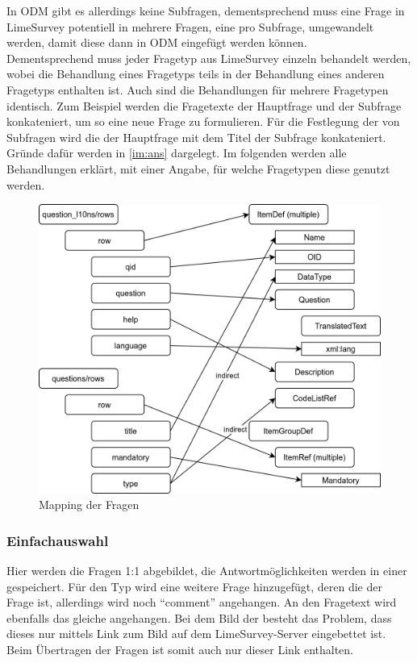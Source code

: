 In ODM gibt es allerdings keine Subfragen, dementsprechend muss eine Frage in LimeSurvey potentiell in mehrere Fragen, eine pro Subfrage, umgewandelt werden, damit diese dann in ODM eingefügt werden können.\\

Dementsprechend muss jeder Fragetyp aus LimeSurvey einzeln behandelt werden, wobei die Behandlung eines Fragetyps teils in der Behandlung eines anderen Fragetyps enthalten ist.
Auch sind die Behandlungen für mehrere Fragetypen identisch.
Zum Beispiel werden die Fragetexte der Hauptfrage und der Subfrage konkateniert, um so eine neue Frage  zu formulieren.
Für die Festlegung der  von Subfragen wird die  der Hauptfrage mit dem Titel der Subfrage konkateniert.
Gründe dafür werden in \cref{im:ans} dargelegt.
Im folgenden werden alle Behandlungen erklärt, mit einer Angabe, für welche Fragetypen diese genutzt werden.

\begin{figure}[h]
			\centering
			\includegraphics[width=.80\textwidth]{./img/m_questions.png}
			\caption{Mapping der Fragen}
\end{figure}

\subsubsection{Einfachauswahl}
\label{e:sc}

Hier werden die Fragen 1:1 abgebildet, die Antwortmöglichkeiten werden in einer  gespeichert.
Für den Typ  wird eine weitere Frage hinzugefügt, deren  die  der Frage ist, allerdings wird noch \enquote{comment} angehangen.
An den Fragetext wird ebenfalls das gleiche angehangen.
Bei dem Bild der  besteht das Problem, dass dieses nur mittels Link zum Bild auf dem LimeSurvey-Server eingebettet ist.
Beim Übertragen der Fragen ist somit auch nur dieser Link enthalten.

